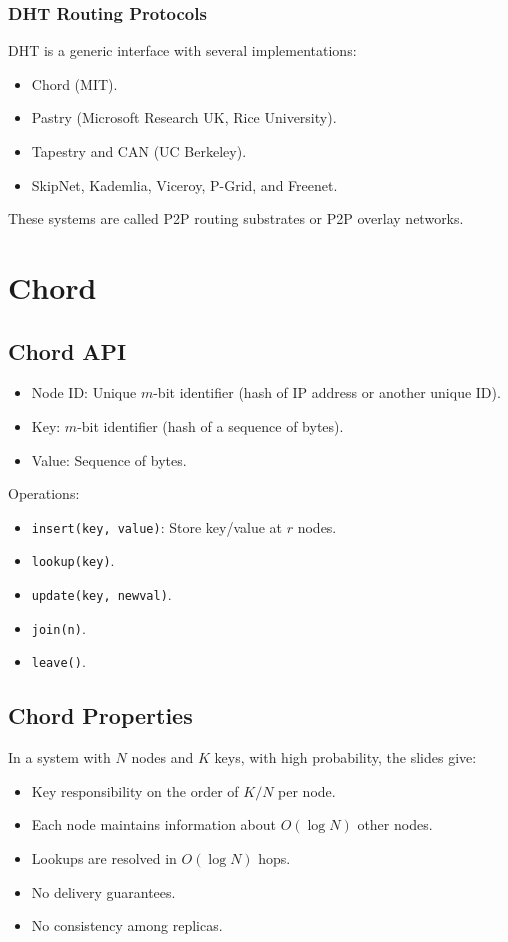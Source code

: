 \documentclass{article}
\begin{document}
\subsubsection{DHT Routing Protocols}

DHT is a generic interface with several implementations:
\begin{itemize}
    \item Chord (MIT).
    \item Pastry (Microsoft Research UK, Rice University).
    \item Tapestry and CAN (UC Berkeley).
    \item SkipNet, Kademlia, Viceroy, P-Grid, and Freenet.
\end{itemize}

These systems are called P2P routing substrates or P2P overlay networks.

\section{Chord}

\subsection{Chord API}
\begin{itemize}
    \item Node ID: Unique \(m\)-bit identifier (hash of IP address or another unique ID).
    \item Key: \(m\)-bit identifier (hash of a sequence of bytes).
    \item Value: Sequence of bytes.
\end{itemize}

Operations:
\begin{itemize}
    \item \texttt{insert(key, value)}: Store key/value at \(r\) nodes.
    \item \texttt{lookup(key)}.
    \item \texttt{update(key, newval)}.
    \item \texttt{join(n)}.
    \item \texttt{leave()}.
\end{itemize}

\subsection{Chord Properties}

In a system with \(N\) nodes and \(K\) keys, with high probability, the slides give:
\begin{itemize}
    \item Key responsibility on the order of \(K/N\) per node.
    \item Each node maintains information about \(O(\log N)\) other nodes.
    \item Lookups are resolved in \(O(\log N)\) hops.
    \item No delivery guarantees.
    \item No consistency among replicas.
\end{itemize}
\end{document}
